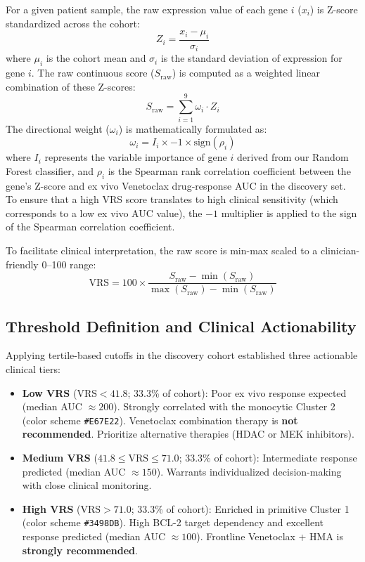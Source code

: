 \documentclass[11pt,a4paper]{article}
\begin{document}
For a given patient sample, the raw expression value of each gene $i$ ($x_i$) is Z-score standardized across the cohort:
\begin{equation}
Z_i = \frac{x_i - \mu_i}{\sigma_i}
\end{equation}
where $\mu_i$ is the cohort mean and $\sigma_i$ is the standard deviation of expression for gene $i$. The raw continuous score ($S_{\text{raw}}$) is computed as a weighted linear combination of these Z-scores:
\begin{equation}
S_{\text{raw}} = \sum_{i=1}^{9} \omega_i \cdot Z_i
\end{equation}
The directional weight ($\omega_i$) is mathematically formulated as:
\begin{equation}
\omega_i = I_i \times -1 \times \text{sign}(\rho_i)
\end{equation}
where $I_i$ represents the variable importance of gene $i$ derived from our Random Forest classifier, and $\rho_i$ is the Spearman rank correlation coefficient between the gene's Z-score and ex vivo Venetoclax drug-response AUC in the discovery set. To ensure that a high VRS score translates to high clinical sensitivity (which corresponds to a low ex vivo AUC value), the $-1$ multiplier is applied to the sign of the Spearman correlation coefficient.

To facilitate clinical interpretation, the raw score is min-max scaled to a clinician-friendly 0--100 range:
\begin{equation}
\text{VRS} = 100 \times \frac{S_{\text{raw}} - \min(S_{\text{raw}})}{\max(S_{\text{raw}}) - \min(S_{\text{raw}})}
\end{equation}

\subsection{Threshold Definition and Clinical Actionability}
Applying tertile-based cutoffs in the discovery cohort established three actionable clinical tiers:
\begin{itemize}
    \item \textbf{Low VRS} ($\text{VRS} < 41.8$; 33.3\% of cohort): Poor ex vivo response expected (median AUC $\approx 200$). Strongly correlated with the monocytic Cluster 2 (color scheme \texttt{\#E67E22}). Venetoclax combination therapy is \textbf{not recommended}. Prioritize alternative therapies (HDAC or MEK inhibitors).
    \item \textbf{Medium VRS} ($41.8 \le \text{VRS} \le 71.0$; 33.3\% of cohort): Intermediate response predicted (median AUC $\approx 150$). Warrants individualized decision-making with close clinical monitoring.
    \item \textbf{High VRS} ($\text{VRS} > 71.0$; 33.3\% of cohort): Enriched in primitive Cluster 1 (color scheme \texttt{\#3498DB}). High BCL-2 target dependency and excellent response predicted (median AUC $\approx 100$). Frontline Venetoclax + HMA is \textbf{strongly recommended}.
\end{itemize}
\end{document}
